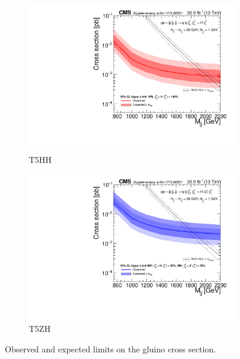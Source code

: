 \begin{figure}
\centering
\begin{subfigure}[b]{0.49\textwidth}
\includegraphics[width=\textwidth]{figs/brazilT5HHResults.pdf}
\caption{T5HH}
\end{subfigure}
\begin{subfigure}[b]{0.49\textwidth}
\includegraphics[width=\textwidth]{figs/brazilT5HZResults.pdf}
\caption{T5ZH}
\end{subfigure}
\caption{Observed and expected limits on the gluino cross section.}
\label{fig:brazil}
\end{figure}
